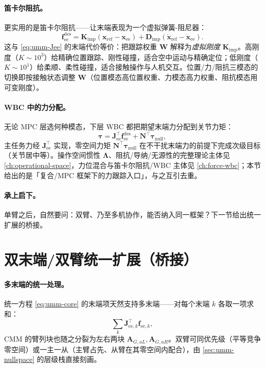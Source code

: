 \paragraph{笛卡尔阻抗。}
更实用的是笛卡尔阻抗——让末端表现为一个虚拟弹簧-阻尼器：
\begin{equation}
  \mathbf f_{\text{ee}}^{\text{des}}=\mathbf K_{\text{imp}}(\mathbf x_{\text{ref}}-\mathbf x_{\text{ee}})+\mathbf D_{\text{imp}}(\dot{\mathbf x}_{\text{ref}}-\dot{\mathbf x}_{\text{ee}}).
  \label{eq:umm-impedance}
\end{equation}
这与 \cref{eq:umm-Jee} 的末端代价等价：把跟踪权重 $\mathbf W$ 解释为\emph{虚拟刚度} $\mathbf K_{\text{imp}}$。高刚度（$K\sim10^3$）给精确位置跟踪、刚性碰撞，适合空中运动与精确定位；低刚度（$K\sim10^1$）给柔顺、柔性碰撞，适合接触操作与人机交互。位置/力/阻抗三模态的切换即按接触状态调整 $\mathbf W$（位置模态高位置权重、力模态高力权重、阻抗模态用可变刚度）。

\paragraph{WBC 中的力分配。}
无论 MPC 层选何种模态，下层 WBC 都把期望末端力分配到关节力矩：
\begin{equation}
  \boldsymbol\tau=\mathbf J_{\text{ee}}^\top\mathbf f_{\text{ee}}^{\text{des}}+\mathbf N^\top\boldsymbol\tau_{\text{null}},
  \label{eq:umm-force-alloc}
\end{equation}
主任务力经 $\mathbf J_{\text{ee}}^\top$ 实现，零空间力矩 $\mathbf N^\top\boldsymbol\tau_{\text{null}}$ 在不干扰末端力的前提下完成次级目标（关节居中等）。操作空间惯性 $\boldsymbol\Lambda$、阻抗/导纳/无源性的完整理论主体见 \cref{ch:operational-space}，力位混合与笛卡尔阻抗/WBC 主体见 \cref{ch:force-wbc}；本节给出的是「复合/MPC 框架下的力跟踪入口」，与之互引去重。

\paragraph{承上启下。}
单臂之后，自然要问：双臂、乃至多机协作，能否纳入同一框架？下一节给出统一扩展的桥接。

\section{双末端/双臂统一扩展（桥接）}
\label{sec:umm-dualarm}

\paragraph{多末端的统一处理。}
统一方程 \cref{eq:umm-core} 的末端项天然支持多末端——对每个末端 $k$ 各取一项求和：
\begin{equation}
  \sum_k\mathbf J_{\text{ee},k}^\top\mathbf f_{\text{ee},k},
  \label{eq:umm-multiee}
\end{equation}
CMM 的臂列块也随之分裂为左右两块 $\mathbf A_{G,aL},\mathbf A_{G,aR}$。双臂可同优先级（平等竞争零空间）或一主一从（主臂占先、从臂在其零空间内配合），由 \cref{sec:umm-nullspace} 的层级栈直接刻画。

